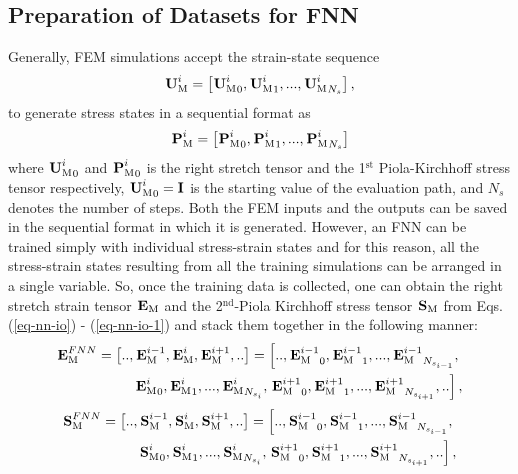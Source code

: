 
\subsection{Preparation of Datasets for FNN}\label{nn-mono-datapre}
Generally, FEM simulations accept the strain-state sequence
\begin{equation}\label{eq-nn-data1}
\tgm[]{U}^i = \left[{\tgm[]{U}^i}_0,{\tgm[]{U}^i}_1,...,{\tgm[]{U}^i}_{N_{s}}\right],
\end{equation}
to generate stress states in a sequential format as%
\begin{equation}\label{eq-nn-data2}
\tgm[]{P}^i = \left[{\tgm[]{P}^i}_0,{\tgm[]{P}^i}_1,...,{\tgm[]{P}^i}_{N_{s}}\right]
\end{equation}
where 
$ {\tgm[]{U}^i}_0 $ and 
$ {\tgm[]{P}^i}_0 $ is 
the right stretch tensor and the 1$ ^\text{st} $ Piola-Kirchhoff stress tensor respectively, $  {\tgm[]{U}^i}_0=\textbf{I} $ is the starting value of the evaluation path, and $ N_s $ denotes the number of steps. Both the FEM inputs and the outputs can be saved in the sequential format in which it is generated. However, an FNN can be trained simply with individual stress-strain states and for this reason, all the stress-strain states resulting from all the training simulations can be arranged in a single variable. So, once the training data is collected, one can obtain the right stretch strain tensor $ \tgm[]{E} $ and the 2$ ^\text{nd} $-Piola Kirchhoff stress tensor $ \tgm[]{S} $ from Eqs. (\ref{eq-nn-io}) - (\ref{eq-nn-io-1}) and stack them together in the following manner:
\begin{eqnarray}\label{eq-nn-data3}
\tgm[]{E}^{FNN}=\left[..,\tgm[]{E}^{i-1},\tgm[]{E}^i,\tgm[]{E}^{i+1},..\right] = 
\left[..,{\tgm[]{E}^{i-1}}_0,{\tgm[]{E}^{i-1}}_1,...,{\tgm[]{E}^{i-1}}_{N_{s_{i-1}}},\right.\nonumber\\
{\tgm[]{E}^i}_0,{\tgm[]{E}^i}_1,...,{\tgm[]{E}^i}_{N_{s_i}},
\left.{\tgm[]{E}^{i+1}}_0,{\tgm[]{E}^{i+1}}_1,...,{\tgm[]{E}^{i+1}}_{N_{s_{i+1}}},..\right],
\end{eqnarray}
\begin{eqnarray}\label{eq-nn-data4}
\tgm[]{S}^{FNN}=\left[..,\tgm[]{S}^{i-1},\tgm[]{S}^i,\tgm[]{S}^{i+1},..\right] = 
\left[..,{\tgm[]{S}^{i-1}}_0,{\tgm[]{S}^{i-1}}_1,...,{\tgm[]{S}^{i-1}}_{N_{s_{i-1}}},\right.\nonumber\\
{\tgm[]{S}^i}_0,{\tgm[]{S}^i}_1,...,{\tgm[]{S}^i}_{N_{s_i}},
\left.{\tgm[]{S}^{i+1}}_0,{\tgm[]{S}^{i+1}}_1,...,{\tgm[]{S}^{i+1}}_{N_{s_{i+1}}},..\right],
\end{eqnarray}

